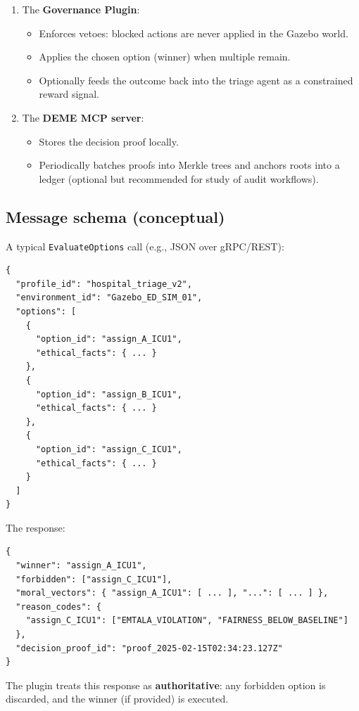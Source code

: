 \documentclass[11pt]{article}
\begin{document}
\begin{enumerate}
  \item The \textbf{Governance Plugin}:
    \begin{itemize}
      \item Enforces vetoes: blocked actions are never applied in the Gazebo world.
      \item Applies the chosen option (winner) when multiple remain.
      \item Optionally feeds the outcome back into the triage agent as a constrained reward signal.
    \end{itemize}

  \item The \textbf{DEME MCP server}:
    \begin{itemize}
      \item Stores the decision proof locally.
      \item Periodically batches proofs into Merkle trees and anchors roots into a ledger (optional but recommended for study of audit workflows).
    \end{itemize}
\end{enumerate}

\subsection{Message schema (conceptual)}

A typical \texttt{EvaluateOptions} call (e.g., JSON over gRPC/REST):

\begin{lstlisting}
{
  "profile_id": "hospital_triage_v2",
  "environment_id": "Gazebo_ED_SIM_01",
  "options": [
    {
      "option_id": "assign_A_ICU1",
      "ethical_facts": { ... }
    },
    {
      "option_id": "assign_B_ICU1",
      "ethical_facts": { ... }
    },
    {
      "option_id": "assign_C_ICU1",
      "ethical_facts": { ... }
    }
  ]
}
\end{lstlisting}

The response:

\begin{lstlisting}
{
  "winner": "assign_A_ICU1",
  "forbidden": ["assign_C_ICU1"],
  "moral_vectors": { "assign_A_ICU1": [ ... ], "...": [ ... ] },
  "reason_codes": {
    "assign_C_ICU1": ["EMTALA_VIOLATION", "FAIRNESS_BELOW_BASELINE"]
  },
  "decision_proof_id": "proof_2025-02-15T02:34:23.127Z"
}
\end{lstlisting}

The plugin treats this response as \textbf{authoritative}: any forbidden option is discarded, and the winner (if provided) is executed.
\end{document}

